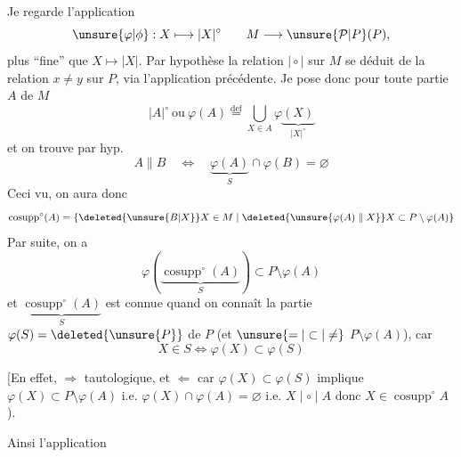 
Je regarde l'application
\[
 \unsure{\varphi|\phi}:X\longmapsto|X|^{\circ}\qquad M\longrightarrow\unsure{\mathcal{P}|P}(P),
\]
plus ``fine'' que $X\longmapsto|X|$. Par hypothèse la relation $\mid\circ\mid$ sur $M$ se déduit de la  relation $x\ne y$ sur $P$, via l'application précédente. Je pose donc pour toute partie $A$ de $M$
\[
 |A|^{\circ}\ \text{ou}\ \varphi(A)\overset{\mathrm{def}}{=}\bigcup_{X\in A}\varphi\underbrace{(X)}_{|X|^{\circ}}
\]
et on trouve par hyp.
\[
 A\mathrel{\|}B\quad\Longleftrightarrow\quad\underbrace{\varphi(A)}_{S}\cap\varphi(B)=\varnothing
\]
Ceci vu, on aura donc
\[
 \operatorname{cosupp}^{\circ}(A)=\{\deleted{\unsure{B|X}}X\in M\mid\deleted{\unsure{\varphi(A)\mathrel{\|}X}}X\subset P\setminus\varphi(A)\}
\]
Par suite, on a
\[
 \varphi(\underbrace{\operatorname{cosupp}^{\circ}(A)}_{S})\subset P\setminus\varphi(A)
\]
et  $\underbrace{\operatorname{cosupp}^{\circ}(A)}_{S}$ est connue quand on connaît  la partie $\varphi(S)=\deleted{\unsure{P}}$ de $P$ (et $\unsure{=|\subset|\ne}$  $P\setminus\varphi(A)$), car
\[
 X\in S\Longleftrightarrow\varphi(X)\subset\varphi(S)
\]

[En effet, $\Rightarrow$ tautologique, et $\Leftarrow$ car $\varphi(X)\subset\varphi(S)$ implique $\varphi(X)\subset P\setminus\varphi(A)$ i.e. $\varphi(X)\cap\varphi(A)=\varnothing$ i.e. $X\mid\circ\mid A$ donc $X\in\operatorname{cosupp}^{\circ}A$).

Ainsi l'application
